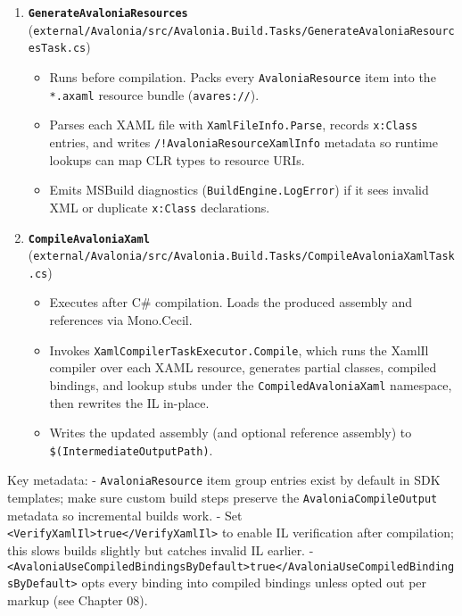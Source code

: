 \begin{enumerate}
\def\labelenumi{\arabic{enumi}.}
\tightlist
\item
  \textbf{\passthrough{\lstinline!GenerateAvaloniaResources!}}
  (\passthrough{\lstinline!external/Avalonia/src/Avalonia.Build.Tasks/GenerateAvaloniaResourcesTask.cs!})

  \begin{itemize}
  \tightlist
  \item
    Runs before compilation. Packs every
    \passthrough{\lstinline!AvaloniaResource!} item into the
    \passthrough{\lstinline!*.axaml!} resource bundle
    (\passthrough{\lstinline!avares://!}).
  \item
    Parses each XAML file with
    \passthrough{\lstinline!XamlFileInfo.Parse!}, records
    \passthrough{\lstinline!x:Class!} entries, and writes
    \passthrough{\lstinline"/!AvaloniaResourceXamlInfo"} metadata so
    runtime lookups can map CLR types to resource URIs.
  \item
    Emits MSBuild diagnostics
    (\passthrough{\lstinline!BuildEngine.LogError!}) if it sees invalid
    XML or duplicate \passthrough{\lstinline!x:Class!} declarations.
  \end{itemize}
\item
  \textbf{\passthrough{\lstinline!CompileAvaloniaXaml!}}
  (\passthrough{\lstinline!external/Avalonia/src/Avalonia.Build.Tasks/CompileAvaloniaXamlTask.cs!})

  \begin{itemize}
  \tightlist
  \item
    Executes after C\# compilation. Loads the produced assembly and
    references via Mono.Cecil.
  \item
    Invokes \passthrough{\lstinline!XamlCompilerTaskExecutor.Compile!},
    which runs the XamlIl compiler over each XAML resource, generates
    partial classes, compiled bindings, and lookup stubs under the
    \passthrough{\lstinline!CompiledAvaloniaXaml!} namespace, then
    rewrites the IL in-place.
  \item
    Writes the updated assembly (and optional reference assembly) to
    \passthrough{\lstinline!$(IntermediateOutputPath)!}.
  \end{itemize}
\end{enumerate}

Key metadata: - \passthrough{\lstinline!AvaloniaResource!} item group
entries exist by default in SDK templates; make sure custom build steps
preserve the \passthrough{\lstinline!AvaloniaCompileOutput!} metadata so
incremental builds work. - Set
\passthrough{\lstinline!<VerifyXamlIl>true</VerifyXamlIl>!} to enable IL
verification after compilation; this slows builds slightly but catches
invalid IL earlier. -
\passthrough{\lstinline!<AvaloniaUseCompiledBindingsByDefault>true</AvaloniaUseCompiledBindingsByDefault>!}
opts every binding into compiled bindings unless opted out per markup
(see Chapter 08).

